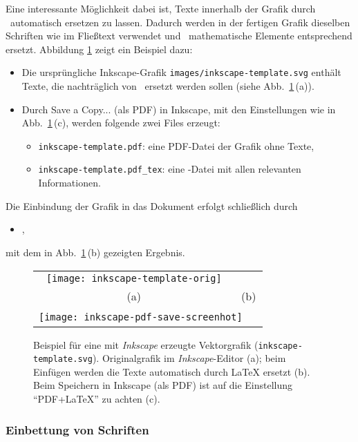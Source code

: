 Eine interessante Möglichkeit dabei ist, Texte innerhalb der Grafik
durch \latex\ automatisch ersetzen zu lassen.
Dadurch werden in der fertigen Grafik dieselben Schriften wie im Fließtext
verwendet und \va\ mathematische Elemente entsprechend ersetzt.
Abbildung \ref{fig:InkscapeExample} zeigt ein Beispiel dazu:
%
\begin{itemize}
\item
Die ursprüngliche Inkscape-Grafik \nolinkurl{images/inkscape-template.svg}  enthält
Texte, die nachträglich von \latex\ ersetzt werden sollen 
(siehe Abb.~\ref{fig:InkscapeExample}\,(a)).
\item
Durch \textsf{Save a Copy...} (als PDF) in Inkscape, mit den Einstellungen wie in 
Abb.~\ref{fig:InkscapeExample}\,(c), werden folgende zwei Files erzeugt:
\begin{itemize}
\item[] \nolinkurl{inkscape-template.pdf}: eine PDF-Datei der Grafik ohne Texte, 
\item[] \nolinkurl{inkscape-template.pdf_tex}: eine \latex-Datei mit allen relevanten Informationen.
\end{itemize}
\end{itemize}
%
Die Einbindung der Grafik in das Dokument erfolgt schließlich durch
\begin{itemize}
\item[] \verb!!,
\end{itemize}
mit dem in Abb.~\ref{fig:InkscapeExample}\,(b) gezeigten Ergebnis.



\begin{figure}
\centering\small
\begin{tabular}{cc}
\texttt{[image: inkscape-template-orig]} &

\\
(a) & (b)
\\[6pt]
\multicolumn{2}{c}{\texttt{[image: inkscape-pdf-save-screenhot]}%
~~\raisebox{25mm}{(c)}}
\end{tabular}
\caption{Beispiel für eine mit \emph{Inkscape} erzeugte Vektorgrafik
(\nolinkurl{inkscape-template.svg}).
Originalgrafik im \textit{Inkscape}-Editor (a);
beim Einfügen werden die Texte automatisch durch LaTeX ersetzt (b).
Beim Speichern in Inkscape (als PDF) ist auf die Einstellung "`PDF+LaTeX"' zu achten (c).}
\label{fig:InkscapeExample}
\end{figure}


\subsubsection{Einbettung von Schriften}

